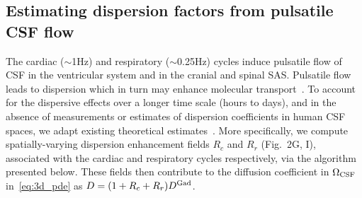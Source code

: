 \documentclass[fleqn,10pt]{wlscirep}
\begin{document}
\subsection{Estimating dispersion factors from pulsatile CSF flow}
\label{sec:app:dispersion}

The cardiac ($\sim$1Hz) and respiratory ($\sim$0.25Hz) cycles induce
pulsatile flow of CSF in the ventricular system and in the cranial and
spinal SAS. Pulsatile flow leads to dispersion which in turn may
enhance molecular transport~\cite{taylor1953dispersion,
  watson1983diffusion, asgari2016glymphatic, sharp2019dispersion,
  ray2021quantitative, troyetsky2021dispersion}. To account for the
dispersive effects over a longer time scale (hours to days), and in
the absence of measurements or estimates of dispersion coefficients in
human CSF spaces, we adapt existing theoretical
estimates~\cite{watson1983diffusion, sharp2019dispersion}. More
specifically, we compute spatially-varying dispersion enhancement
fields $R_c$ and $R_r$ (Fig.~2G, I), associated with the
cardiac and respiratory cycles respectively, via the algorithm
presented below. These fields then contribute to the diffusion
coefficient in $\Omega_{\rm CSF}$ in~\eqref{eq:3d_pde} as $D = (1 +
R_c + R_r) D^{\rm Gad}$.
\end{document}
